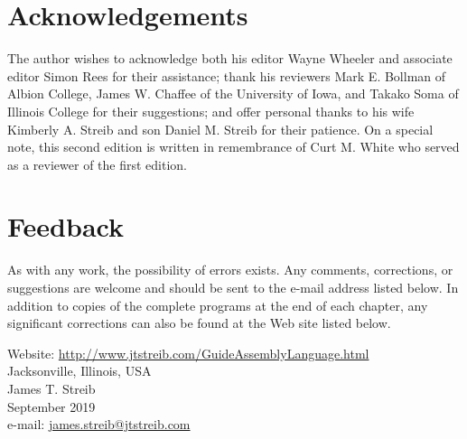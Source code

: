 \documentclass[10pt]{article}
\begin{document}
\section*{Acknowledgements}
The author wishes to acknowledge both his editor Wayne Wheeler and associate editor Simon Rees for their assistance; thank his reviewers Mark E. Bollman of Albion College, James W. Chaffee of the University of Iowa, and Takako Soma of Illinois College for their suggestions; and offer personal thanks to his wife Kimberly A. Streib and son Daniel M. Streib for their patience. On a special note, this second edition is written in remembrance of Curt M. White who served as a reviewer of the first edition.

\section*{Feedback}
As with any work, the possibility of errors exists. Any comments, corrections, or suggestions are welcome and should be sent to the e-mail address listed below. In addition to copies of the complete programs at the end of each chapter, any significant corrections can also be found at the Web site listed below.

Website: \href{http://www.jtstreib.com/GuideAssemblyLanguage.html}{http://www.jtstreib.com/GuideAssemblyLanguage.html}\\
Jacksonville, Illinois, USA\\
James T. Streib\\
September 2019\\
e-mail: \href{mailto:james.streib@jtstreib.com}{james.streib@jtstreib.com}
\end{document}

